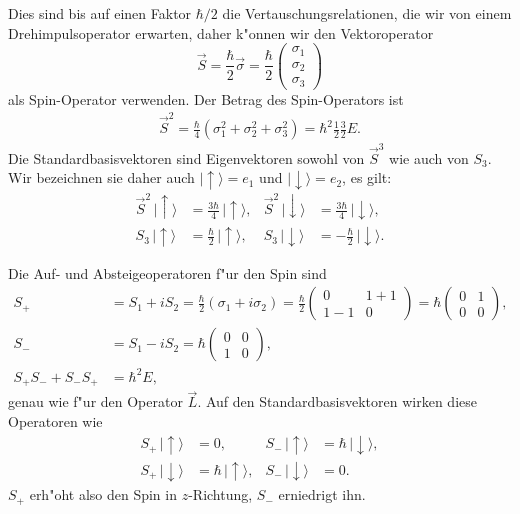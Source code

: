 Dies sind bis auf einen Faktor $\hbar/2$ die Vertauschungsrelationen,
die wir von einem Drehimpulsoperator erwarten,
daher k"onnen wir den Vektoroperator
\begin{equation}
\vec S=\frac{\hbar}2\vec\sigma
=
\frac{\hbar}2\begin{pmatrix}\sigma_1\\\sigma_2\\\sigma_3\end{pmatrix}
\label{spin:vektoroperator}
\end{equation}
als Spin-Operator verwenden.
%
Der Betrag des Spin-Operators ist
\begin{align*}
\vec S^2
=
\frac{\hbar}{4}(\sigma_1^2+\sigma_2^2+\sigma_3^2)=\hbar^2\frac12\frac32E.
\end{align*}
Die Standardbasisvektoren sind Eigenvektoren sowohl von $\vec S^3$ wie
auch von $S_3$.
Wir bezeichnen sie daher auch $|\uparrow\rangle=e_1$ und
$|\downarrow\rangle=e_2$, es gilt:
\begin{align*}
\vec S^2\,|\uparrow\rangle&=\frac{3\hbar}4\,|\uparrow\rangle,
&
\vec S^2\,|\downarrow\rangle&=\frac{3\hbar}4\,|\downarrow\rangle,
\\
S_3\,|\uparrow\rangle&=\frac{\hbar}{2}\,|\uparrow\rangle,
&
S_3\,|\downarrow\rangle&=-\frac{\hbar}{2}\,|\downarrow\rangle.
\end{align*}

Die Auf- und Absteigeoperatoren f"ur den Spin sind
%
\begin{align}
S_+
&=
S_1+iS_2
=
\frac{\hbar}2
(\sigma_1+i\sigma_2)
=
\frac{\hbar}2
\begin{pmatrix} 0&1+1\\1-1&0 \end{pmatrix}
=\hbar\begin{pmatrix}0&1\\0&0\end{pmatrix},
\\
S_-
&=
S_1-iS_2
=
\hbar\begin{pmatrix} 0&0\\1&0\end{pmatrix},
\\
S_+S_-+S_-S_+
&=
\hbar^2E,
\end{align}
genau wie f"ur den Operator $\vec L$.
Auf den Standardbasisvektoren wirken diese Operatoren wie
\begin{align*}
S_+\,|\uparrow\rangle&=0,
&
S_-\,|\uparrow\rangle&=\hbar\,|\downarrow\rangle,
\\
S_+\,|\downarrow\rangle&=\hbar\,|\uparrow\rangle,
&
S_-\,|\downarrow\rangle&=0.
\end{align*}
$S_+$ erh"oht also den Spin in $z$-Richtung, $S_-$ erniedrigt ihn.

